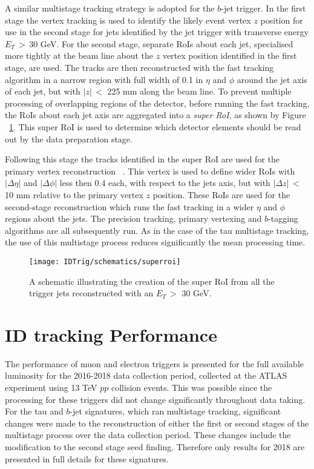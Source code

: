 	A similar multistage tracking strategy is adopted for the $b$-jet trigger. In the first stage the vertex tracking is used to identify the likely event vertex $z$ position for use in the second stage for jets identified by the jet trigger with transverse energy $E_T\,>\,30$ GeV. 
	For the second stage, separate \ac{RoI}s about each jet, specialised more tightly at the beam line about the $z$ vertex position identified in the first stage, are used. 
	The tracks are then reconstructed with the fast tracking algorithm in a narrow region with full width of 0.1 in $\eta$ and $\phi$ around the jet axis of each jet, but with $|z|\,<$ 225 mm along the beam line.
	 To prevent multiple processing of overlapping regions of the detector, before running the fast tracking, the \ac{RoI}s about each jet axis are aggregated into a \textit{super \ac{RoI}}, as shown by Figure ~\ref{fig:superroi}.
	  This super  \ac{RoI} is used to determine which detector elements should be read out by the data preparation stage.
	
	Following this stage the tracks identified in the super \ac{RoI} are used for the primary vertex reconstruction ~\cite{Meloni_2016}. This vertex is used to define wider \ac{RoI}s with $|\Delta\eta|$ and $|\Delta\phi|$ less then 0.4 each, with respect to the jets axis, but with $|\Delta z|\,<$ 10 mm relative to the primary vertex $z$ position.
	These \ac{RoI}s are used for the second-stage reconstruction which runs the fast tracking in a wider $\eta$ and $\phi$ regions about the jets. The precision tracking, primary vertexing and $b$-tagging algorithms are all subsequently run. As in the case of the tau multistage tracking, the use of this multistage process reduces significantly the mean processing time. 
	\begin{figure}[!hbt]
	\centering
	\texttt{[image: IDTrig/schematics/superroi]}
	\caption{A schematic illustrating the creation of the super \ac{RoI} from all the trigger jets reconstructed with an $E_T\,>$ 30 GeV.}
	\label{fig:superroi}
\end{figure} 

	
	\section{ID tracking Performance}
	\label{sec:idtrigperf}
	The performance of muon and electron triggers is presented for the full available luminosity for the 2016-2018 data collection period, collected at the \ac{ATLAS} experiment using 13 TeV $pp$ collision events. This was possible since the processing for these triggers did not change significantly throughout data taking. For the tau and $b$-jet signatures, which ran multistage tracking, significant changes were made to the reconstruction of either the first or second stages of the multistage process over the data collection period. These changes include the modification to the second stage seed finding. Therefore only results for 2018 are  presented in full details for these signatures. 
	
